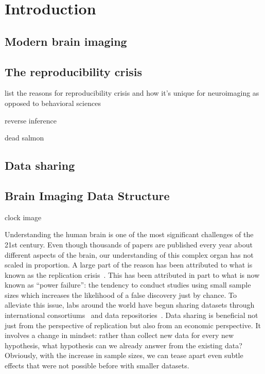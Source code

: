 \chapter{Introduction}

\section{Modern brain imaging}
\section{The reproducibility crisis}

list the reasons for reproducibility crisis and how it's unique for neuroimaging as opposed to behavioral sciences

reverse inference

dead salmon

\section{Data sharing}
\section{Brain Imaging Data Structure}

clock image

Understanding the human brain is one of the most significant challenges of the 21st century. Even though thousands of papers are published every year about different aspects of the brain, our understanding of this complex organ has not scaled in proportion. A large part of the reason has been attributed to what is known as the replication crisis~\citep{ioannidis2005most, simmons2011false, button2013power}. This has been attributed in part to what is now known as ``power failure'': the tendency to conduct studies using small sample sizes which increases the likelihood of a false discovery just by chance. To alleviate this issue, labs around the world have begun sharing datasets through international consortiums~\citep{van2013wu, ollier2005uk} and data repositories~\citep{poldrack2013toward, gorgolewski2015neurovault}. Data sharing is beneficial not just from the perspective of replication but also from an economic perspective. It involves a change in mindset: rather than collect new data for every new hypothesis, what hypothesis can we already answer from the existing data? Obviously, with the increase in sample sizes, we can tease apart even subtle effects that were not possible before with smaller datasets.

